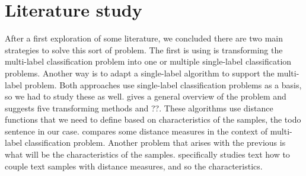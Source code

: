 \section{Literature study}
After a first exploration of some literature, we concluded there are two main strategies to solve this sort of problem. The first is using is transforming the multi-label classification problem into one or multiple single-label classification problems. Another way is to adapt a single-label algorithm to support the multi-label problem. Both approaches use single-label classification problems as a basis, so we had to study these as well. \cite{Tsoumakas07multi-labelclassification:} gives a general overview of the problem and suggests five transforming methods and ??. These algorithms use distance functions that we need to define based on characteristics of the samples, the todo sentence in our case. \cite{gjorgjioskicomparison} compares some distance measures in the context of multi-label classification problem. Another problem that arises with the previous is what will be the characteristics of the samples. \cite{jing2006ontology} specifically studies text how to couple text samples with distance measures, and so the characteristics.